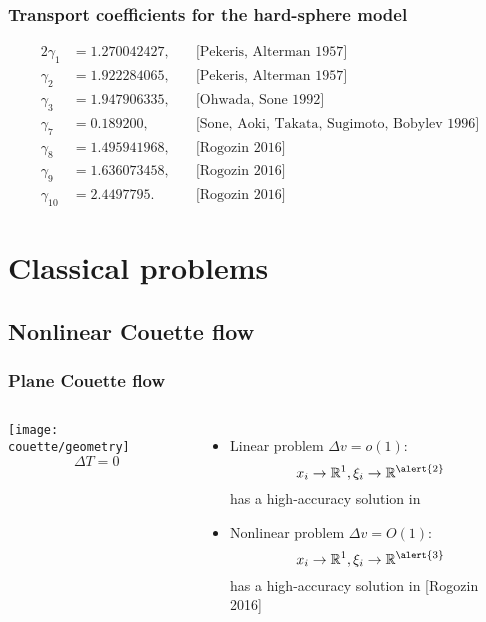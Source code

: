 \documentclass[mathserif]{beamer} %
\newcommand{\OO}[1]{O(#1)}
\begin{document}
\begin{frame}
    \frametitle{Transport coefficients for the hard-sphere model}
    \begin{alignat*}{2}
        \gamma_1 &= 1.270042427, \quad &\text{[Pekeris, Alterman 1957]} \\
        \gamma_2 &= 1.922284065, \quad &\text{[Pekeris, Alterman 1957]} \\
        \gamma_3 &= 1.947906335, \quad &\text{[Ohwada, Sone 1992]} \\
        \gamma_7 &= 0.189200,    \quad &\text{[Sone, Aoki, Takata, Sugimoto, Bobylev 1996]} \\
        \gamma_8 &= 1.495941968, \quad &\text{[Rogozin 2016]} \\
        \gamma_9 &= 1.636073458, \quad &\text{[Rogozin 2016]} \\
        \gamma_{10} &= 2.4497795.\quad &\text{[Rogozin 2016]}
    \end{alignat*}
\end{frame}

\section{Classical problems}
\subsection{Nonlinear Couette flow}

\begin{frame}
    \frametitle{Plane Couette flow}
    \begin{columns}
        \hspace{-10pt}\texttt{[image: couette/geometry]}
        \[\Delta{T} = 0\]
        \begin{itemize}
            \item Linear problem \(\Delta{v} = o(1)\): \[ x_i\to\mathbb{R}^1, \xi_i\to\mathbb{R}^{\alert{2}}\]
            has a high-accuracy solution in 
            \bigskip
            \item Nonlinear problem \(\Delta{v} = \OO{1}\): \[ x_i\to\mathbb{R}^1, \xi_i\to\mathbb{R}^{\alert{3}} \]
            has a high-accuracy solution in [Rogozin 2016]
        \end{itemize}
    \end{columns}
\end{frame}
\end{document}

